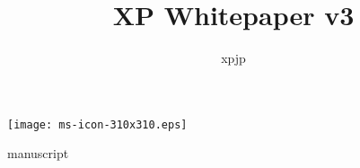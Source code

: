 \documentclass[a4paper]{jsarticle}
\title {XP Whitepaper v3}
\author {xpjp}
\date {}
\begin{document}
\begin{center}
  \texttt{[image: ms-icon-310x310.eps]}
\end{center}
 {manuscript}
\end{document}
